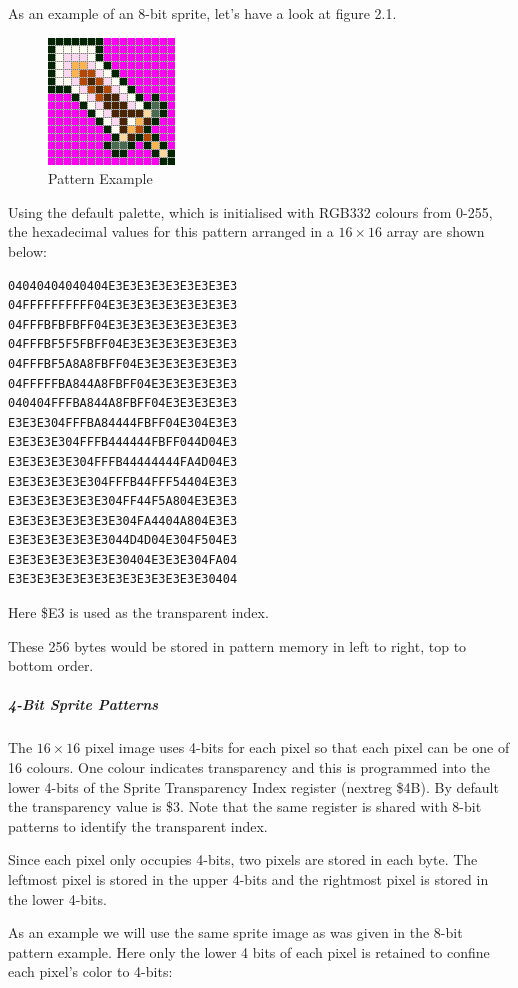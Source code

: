 \sinset
As an example of an 8-bit sprite, let’s have a look at figure 2.1.

\begin{figure}\centering
  \includegraphics{video/sprite_1.png}
  \caption{Pattern Example}
\end{figure}

Using the default palette, which is initialised with RGB332 colours
from 0-255, the hexadecimal values for this pattern arranged in a
$16\times16$ array are shown below:

\begin{verbatim}
04040404040404E3E3E3E3E3E3E3E3E3
04FFFFFFFFFF04E3E3E3E3E3E3E3E3E3
04FFFBFBFBFF04E3E3E3E3E3E3E3E3E3
04FFFBF5F5FBFF04E3E3E3E3E3E3E3E3
04FFFBF5A8A8FBFF04E3E3E3E3E3E3E3
04FFFFFBA844A8FBFF04E3E3E3E3E3E3
040404FFFBA844A8FBFF04E3E3E3E3E3
E3E3E304FFFBA84444FBFF04E304E3E3
E3E3E3E304FFFB444444FBFF044D04E3
E3E3E3E3E304FFFB44444444FA4D04E3
E3E3E3E3E3E304FFFB44FFF54404E3E3
E3E3E3E3E3E3E304FF44F5A804E3E3E3
E3E3E3E3E3E3E3E304FA4404A804E3E3
E3E3E3E3E3E3E3044D4D04E304F504E3
E3E3E3E3E3E3E3E30404E3E3E304FA04
E3E3E3E3E3E3E3E3E3E3E3E3E3E30404
\end{verbatim}

Here \$E3 is used as the transparent index.

These 256 bytes would be stored in pattern memory in left to right,
top to bottom order.
\einset

\subparagraph{4-Bit Sprite Patterns}

The $16\times16$ pixel image uses 4-bits for each pixel so that each
pixel can be one of 16 colours. One colour indicates transparency and
this is programmed into the lower 4-bits of the Sprite Transparency
Index register (nextreg \$4B). By default the transparency value is
\$3. Note that the same register is shared with 8-bit patterns to
identify the transparent index.

Since each pixel only occupies 4-bits, two pixels are stored in each
byte. The leftmost pixel is stored in the upper 4-bits and the
rightmost pixel is stored in the lower 4-bits.

\sinset
As an example we will use the same sprite image as was given in the
8-bit pattern example. Here only the lower 4 bits of each pixel is
retained to confine each pixel’s color to 4-bits:

